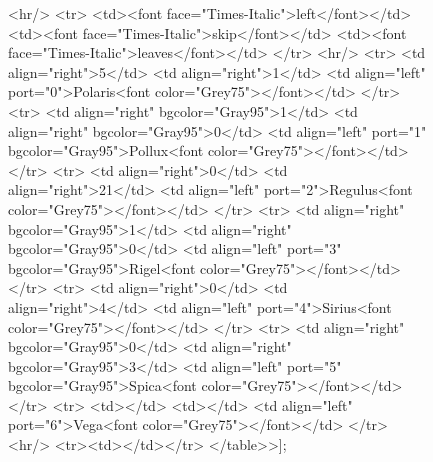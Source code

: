 \documentclass[12pt]{article}
\begin{document}
\begin{figure}
{{	<hr/>
	<tr>
		<td><font face="Times-Italic">left</font></td>
		<td><font face="Times-Italic">skip</font></td>
		<td><font face="Times-Italic">leaves</font></td>
	</tr>
	<hr/>
	<tr>
		<td align="right">5</td>
		<td align="right">1</td>
		<td align="left" port="0">Polaris<font color="Grey75"></font></td>
	</tr>
	<tr>
		<td align="right" bgcolor="Gray95">1</td>
		<td align="right" bgcolor="Gray95">0</td>
		<td align="left" port="1" bgcolor="Gray95">Pollux<font color="Grey75"></font></td>
	</tr>
	<tr>
		<td align="right">0</td>
		<td align="right">21</td>
		<td align="left" port="2">Regulus<font color="Grey75"></font></td>
	</tr>
	<tr>
		<td align="right" bgcolor="Gray95">1</td>
		<td align="right" bgcolor="Gray95">0</td>
		<td align="left" port="3" bgcolor="Gray95">Rigel<font color="Grey75"></font></td>
	</tr>
	<tr>
		<td align="right">0</td>
		<td align="right">4</td>
		<td align="left" port="4">Sirius<font color="Grey75"></font></td>
	</tr>
	<tr>
		<td align="right" bgcolor="Gray95">0</td>
		<td align="right" bgcolor="Gray95">3</td>
		<td align="left" port="5" bgcolor="Gray95">Spica<font color="Grey75"></font></td>
	</tr>
	<tr>
		<td></td>
		<td></td>
		<td align="left" port="6">Vega<font color="Grey75"></font></td>
	</tr>
	<hr/>
	<tr><td></td></tr>
</table>>];
}
	}
\end{figure}
\end{document}
